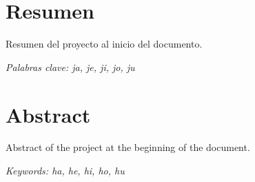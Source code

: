 \setcounter{page}{1}
\chapter*{Resumen}
Resumen del proyecto al inicio del documento.
\lipsum[12]

\textit{Palabras clave: ja, je, ji, jo, ju}

\newpage

\chapter*{Abstract}
Abstract of the project at the beginning of the document.
\lipsum[12]

\textit{Keywords: ha, he, hi, ho, hu}
\cleardoublepage